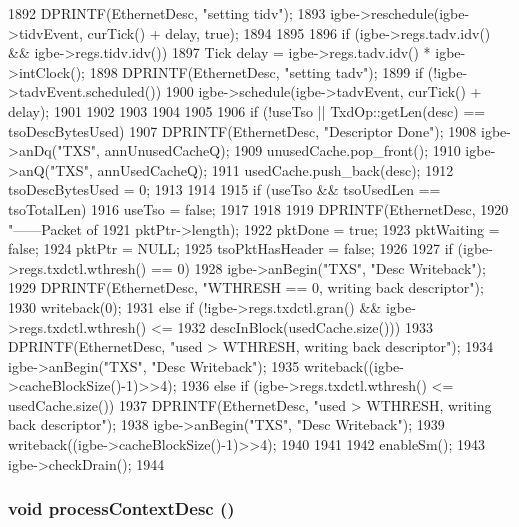 \begin{DoxyCode}
{{{1892             DPRINTF(EthernetDesc, "setting tidv\n");
1893             igbe->reschedule(igbe->tidvEvent, curTick() + delay, true);
1894         }
1895 
1896         if (igbe->regs.tadv.idv() && igbe->regs.tidv.idv()) {
1897             Tick delay = igbe->regs.tadv.idv() * igbe->intClock();
1898             DPRINTF(EthernetDesc, "setting tadv\n");
1899             if (!igbe->tadvEvent.scheduled()) {
1900                 igbe->schedule(igbe->tadvEvent, curTick() + delay);
1901             }
1902         }
1903     }
1904 
1905 
1906     if (!useTso ||  TxdOp::getLen(desc) == tsoDescBytesUsed) {
1907         DPRINTF(EthernetDesc, "Descriptor Done\n");
1908         igbe->anDq("TXS", annUnusedCacheQ);
1909         unusedCache.pop_front();
1910         igbe->anQ("TXS", annUsedCacheQ);
1911         usedCache.push_back(desc);
1912         tsoDescBytesUsed = 0;
1913     }
1914 
1915     if (useTso && tsoUsedLen == tsoTotalLen)
1916         useTso = false;
1917 
1918 
1919     DPRINTF(EthernetDesc,
1920             "------Packet of %
1921             pktPtr->length);
1922     pktDone = true;
1923     pktWaiting = false;
1924     pktPtr = NULL;
1925     tsoPktHasHeader = false;
1926 
1927     if (igbe->regs.txdctl.wthresh() == 0) {
1928         igbe->anBegin("TXS", "Desc Writeback");
1929         DPRINTF(EthernetDesc, "WTHRESH == 0, writing back descriptor\n");
1930         writeback(0);
1931     } else if (!igbe->regs.txdctl.gran() && igbe->regs.txdctl.wthresh() <=
1932                descInBlock(usedCache.size())) {
1933         DPRINTF(EthernetDesc, "used > WTHRESH, writing back descriptor\n");
1934         igbe->anBegin("TXS", "Desc Writeback");
1935         writeback((igbe->cacheBlockSize()-1)>>4);
1936     } else if (igbe->regs.txdctl.wthresh() <= usedCache.size()) {
1937         DPRINTF(EthernetDesc, "used > WTHRESH, writing back descriptor\n");
1938         igbe->anBegin("TXS", "Desc Writeback");
1939         writeback((igbe->cacheBlockSize()-1)>>4);
1940     }
1941 
1942     enableSm();
1943     igbe->checkDrain();
1944 }
\end{DoxyCode}
\hypertarget{classIGbE_1_1TxDescCache_af7a2e6e84647ba93598a7a02730cba41}{
\subsubsection[{processContextDesc}]{\setlength{\rightskip}{0pt plus 5cm}void processContextDesc ()}}
\label{classIGbE_1_1TxDescCache_af7a2e6e84647ba93598a7a02730cba41}



